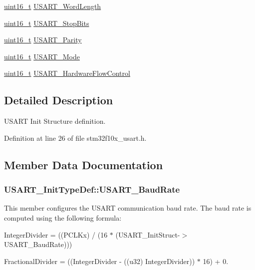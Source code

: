\begin{DoxyCompactItemize}
\item 
\hyperlink{_p_e___types_8h_a1f1825b69244eb3ad2c7165ddc99c956}{uint16\+\_\+t} \hyperlink{struct_u_s_a_r_t___init_type_def_a16d1fb7ccc2b51964f1bcfcbfba6d89d}{U\+S\+A\+R\+T\+\_\+\+Word\+Length}
\item 
\hyperlink{_p_e___types_8h_a1f1825b69244eb3ad2c7165ddc99c956}{uint16\+\_\+t} \hyperlink{struct_u_s_a_r_t___init_type_def_ac745bceb79a6c4c2640fd8e8ce6639d6}{U\+S\+A\+R\+T\+\_\+\+Stop\+Bits}
\item 
\hyperlink{_p_e___types_8h_a1f1825b69244eb3ad2c7165ddc99c956}{uint16\+\_\+t} \hyperlink{struct_u_s_a_r_t___init_type_def_a5ae66aba755bac37c5cf0dfbf529e2ed}{U\+S\+A\+R\+T\+\_\+\+Parity}
\item 
\hyperlink{_p_e___types_8h_a1f1825b69244eb3ad2c7165ddc99c956}{uint16\+\_\+t} \hyperlink{struct_u_s_a_r_t___init_type_def_a7d944d35d7d1fc79a63f249615148584}{U\+S\+A\+R\+T\+\_\+\+Mode}
\item 
\hyperlink{_p_e___types_8h_a1f1825b69244eb3ad2c7165ddc99c956}{uint16\+\_\+t} \hyperlink{struct_u_s_a_r_t___init_type_def_a9996edf3bfd90c36f03b4075969703f5}{U\+S\+A\+R\+T\+\_\+\+Hardware\+Flow\+Control}
\end{DoxyCompactItemize}


\subsection{Detailed Description}
U\+S\+A\+RT Init Structure definition. 

Definition at line 26 of file stm32f10x\+\_\+usart.\+h.



\subsection{Member Data Documentation}
\subsubsection[{\texorpdfstring{U\+S\+A\+R\+T\+\_\+\+Baud\+Rate}{USART_BaudRate}}]{ U\+S\+A\+R\+T\+\_\+\+Init\+Type\+Def\+::\+U\+S\+A\+R\+T\+\_\+\+Baud\+Rate}\hypertarget{struct_u_s_a_r_t___init_type_def_a55c1e540e3436dff7ae5bf0aad3a0f7f}{}\label{struct_u_s_a_r_t___init_type_def_a55c1e540e3436dff7ae5bf0aad3a0f7f}
This member configures the U\+S\+A\+RT communication baud rate. The baud rate is computed using the following formula\+:
\begin{DoxyItemize}
\item Integer\+Divider = ((P\+C\+L\+Kx) / (16 $\ast$ (U\+S\+A\+R\+T\+\_\+\+Init\+Struct-\/$>$U\+S\+A\+R\+T\+\_\+\+Baud\+Rate)))
\item Fractional\+Divider = ((Integer\+Divider -\/ ((u32) Integer\+Divider)) $\ast$ 16) + 0. 
\end{DoxyItemize}

